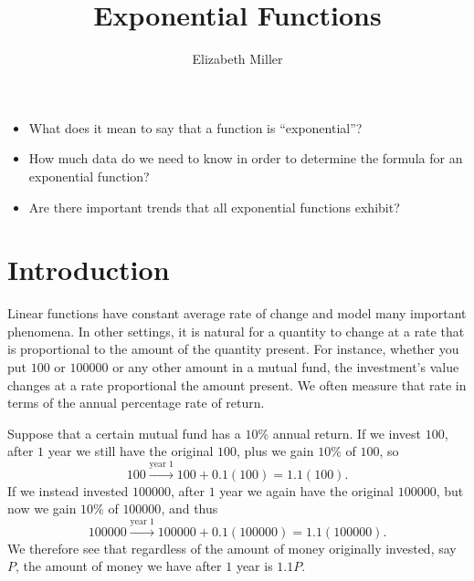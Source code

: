 \documentclass[nooutcomes]{ximera}
\author{Elizabeth Miller}
\title{Exponential Functions}
\begin{document}
\begin{abstract}
  
\end{abstract}
\maketitle



\begin{motivatingQuestions}\begin{itemize}
\item What does it mean to say that a function is ``exponential''?
\item How much data do we need to know in order to determine the formula for an exponential function?
\item Are there important trends that all exponential functions exhibit?
\end{itemize}\end{motivatingQuestions}



\section{Introduction}
Linear functions have constant average rate of change and model many important phenomena.  In other settings, it is natural for a quantity to change at a rate that is proportional to the amount of the quantity present.  For instance, whether you put \textdollar{}$100$ or \textdollar{}$100000$ or any other amount in a mutual fund, the investment's value changes at a rate proportional the amount present.  We often measure that rate in terms of the annual percentage rate of return.

Suppose that a certain mutual fund has a $10$\% annual return.  If we invest \textdollar{}$100$, after $1$ year we still have the original \textdollar{}$100$, plus we gain $10$\% of \textdollar{}$100$, so%
\begin{equation*}
100 \xrightarrow{\text{year } 1} 100 + 0.1(100) = 1.1(100)\text{.}
\end{equation*}
If we instead invested \textdollar{}$100000$, after $1$ year we again have the original \textdollar{}$100000$, but now we gain $10$\% of \textdollar{}$100000$, and thus%
\begin{equation*}
100000 \xrightarrow{\text{year } 1} 100000 + 0.1(100000) = 1.1(100000)\text{.}
\end{equation*}
We therefore see that regardless of the amount of money originally invested, say $P$, the amount of money we have after $1$ year is $1.1P$.
\end{document}
